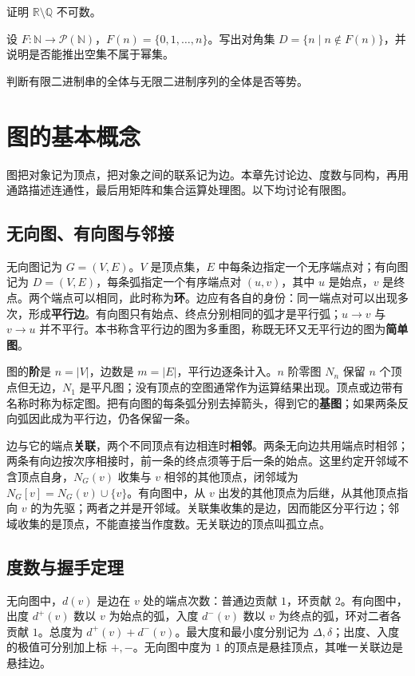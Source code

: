 \documentclass[UTF8,fontset=none,zihao=-4,a4paper]{ctexart}
\newcommand{\chapterpage}[1]{\clearpage\section{#1}}
\newcommand{\term}[1]{\textbf{#1}}
\begin{document}
\begin{enumerate}[label=9.\arabic*.,leftmargin=2.8em]
\begin{samepage}
\item  证明 $\mathbb R\setminus\mathbb Q$ 不可数。
\end{samepage}

\begin{samepage}
\item  设 $F:\mathbb N\to\mathcal P(\mathbb N)$，$F(n)=\{0,1,\ldots,n\}$。写出对角集 $D=\{n\mid n\notin F(n)\}$，并说明是否能推出空集不属于幂集。
\end{samepage}

\begin{samepage}
\item  判断有限二进制串的全体与无限二进制序列的全体是否等势。
\end{samepage}
\end{enumerate}



\chapterpage{图的基本概念}
图把对象记为顶点，把对象之间的联系记为边。本章先讨论边、度数与同构，再用通路描述连通性，最后用矩阵和集合运算处理图。以下均讨论有限图。

\subsection{无向图、有向图与邻接}
无向图记为 $G=(V,E)$。$V$ 是顶点集，$E$ 中每条边指定一个无序端点对；有向图记为 $D=(V,E)$，每条弧指定一个有序端点对 $(u,v)$，其中 $u$ 是始点，$v$ 是终点。两个端点可以相同，此时称为\term{环}。边应有各自的身份：同一端点对可以出现多次，形成\term{平行边}。有向图只有始点、终点分别相同的弧才是平行弧；$u\to v$ 与 $v\to u$ 并不平行。本书称含平行边的图为多重图，称既无环又无平行边的图为\term{简单图}。

图的\term{阶}是 $n=|V|$，边数是 $m=|E|$，平行边逐条计入。$n$ 阶零图 $N_n$ 保留 $n$ 个顶点但无边，$N_1$ 是平凡图；没有顶点的空图通常作为运算结果出现。顶点或边带有名称时称为标定图。把有向图的每条弧分别去掉箭头，得到它的\term{基图}；如果两条反向弧因此成为平行边，仍各保留一条。

边与它的端点\term{关联}，两个不同顶点有边相连时\term{相邻}。两条无向边共用端点时相邻；两条有向边按次序相接时，前一条的终点须等于后一条的始点。这里约定开邻域不含顶点自身，$N_G(v)$ 收集与 $v$ 相邻的其他顶点，闭邻域为 $N_G[v]=N_G(v)\cup\{v\}$。有向图中，从 $v$ 出发的其他顶点为后继，从其他顶点指向 $v$ 的为先驱；两者之并是开邻域。关联集收集的是边，因而能区分平行边；邻域收集的是顶点，不能直接当作度数。无关联边的顶点叫孤立点。

\subsection{度数与握手定理}
无向图中，$d(v)$ 是边在 $v$ 处的端点次数：普通边贡献 $1$，环贡献 $2$。有向图中，出度 $d^+(v)$ 数以 $v$ 为始点的弧，入度 $d^-(v)$ 数以 $v$ 为终点的弧，环对二者各贡献 $1$。总度为 $d^+(v)+d^-(v)$。最大度和最小度分别记为 $\Delta,\delta$；出度、入度的极值可分别加上标 $+,-$。无向图中度为 $1$ 的顶点是悬挂顶点，其唯一关联边是悬挂边。
\end{document}

